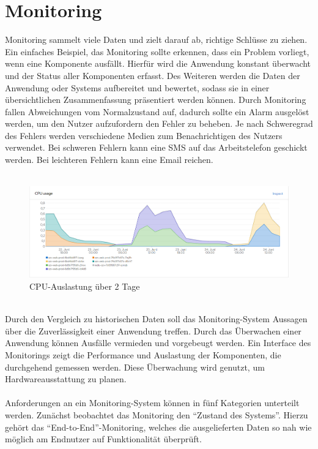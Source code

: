 \section{Monitoring}\label{sec:monitoring}
Monitoring sammelt viele Daten und zielt darauf ab, richtige Schlüsse zu ziehen.
Ein einfaches Beispiel, das Monitoring sollte erkennen, dass ein Problem vorliegt, wenn eine Komponente ausfällt.
Hierfür wird die Anwendung konstant überwacht und der Status aller Komponenten erfasst.
Des Weiteren werden die Daten der Anwendung oder Systems aufbereitet und bewertet, sodass sie in einer übersichtlichen Zusammenfassung präsentiert werden können.
Durch Monitoring fallen Abweichungen vom Normalzustand auf, dadurch sollte ein Alarm ausgelöst werden, um den Nutzer aufzufordern den Fehler zu beheben.
Je nach Schweregrad des Fehlers werden verschiedene Medien zum Benachrichtigen des Nutzers verwendet.
Bei schweren Fehlern kann eine SMS auf das Arbeitstelefon geschickt werden.
Bei leichteren Fehlern kann eine Email reichen.
\\
\\
\begin{figure}[h]
    \centering
    \includegraphics[width=\linewidth]{images/cpu-ozv-web}
    \caption{CPU-Auslastung über 2 Tage}\label{fig:figure}
\end{figure}
\\
Durch den Vergleich zu historischen Daten soll das Monitoring-System Aussagen über die Zuverlässigkeit einer Anwendung treffen.
Durch das Überwachen einer Anwendung können Ausfälle vermieden und vorgebeugt werden.
Ein Interface des Monitorings zeigt die Performance und Auslastung der Komponenten, die durchgehend gemessen werden.
Diese Überwachung wird genutzt, um Hardwareausstattung zu planen.
\\
\\
Anforderungen an ein Monitoring-System können in fünf Kategorien unterteilt werden.
Zunächst beobachtet das Monitoring den \enquote{Zustand des Systems}.
Hierzu gehört das \enquote{End-to-End}-Monitoring, welches die ausgelieferten Daten so nah wie möglich am Endnutzer auf Funktionalität überprüft.
